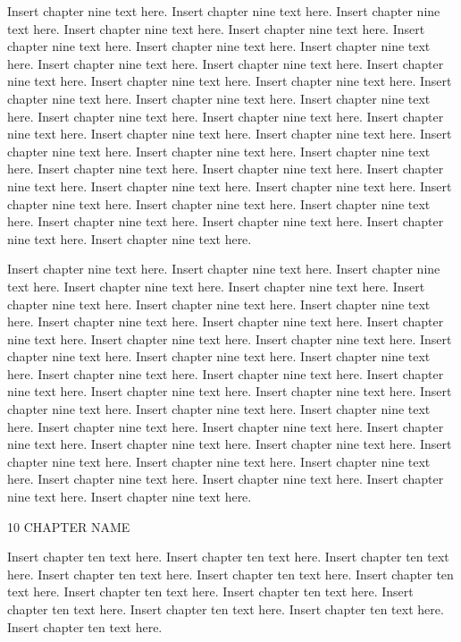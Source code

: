 Insert chapter nine text here. Insert chapter nine text here. Insert chapter nine text here. Insert chapter nine text here. Insert chapter nine text here. Insert chapter nine text here. Insert chapter nine text here. Insert chapter nine text here. Insert chapter nine text here. Insert chapter nine text here. Insert chapter nine text here. Insert chapter nine text here. Insert chapter nine text here. Insert chapter nine text here. Insert chapter nine text here. Insert chapter nine text here. Insert chapter nine text here. Insert chapter nine text here. Insert chapter nine text here. Insert chapter nine text here. Insert chapter nine text here. Insert chapter nine text here. Insert chapter nine text here. Insert chapter nine text here. Insert chapter nine text here. Insert chapter nine text here. Insert chapter nine text here. Insert chapter nine text here. Insert chapter nine text here. Insert chapter nine text here. Insert chapter nine text here. Insert chapter nine text here. Insert chapter nine text here. Insert chapter nine text here. Insert chapter nine text here. Insert chapter nine text here.

Insert chapter nine text here. Insert chapter nine text here. Insert chapter nine text here. Insert chapter nine text here. Insert chapter nine text here. Insert chapter nine text here. Insert chapter nine text here. Insert chapter nine text here. Insert chapter nine text here. Insert chapter nine text here. Insert chapter nine text here. Insert chapter nine text here. Insert chapter nine text here. Insert chapter nine text here. Insert chapter nine text here. Insert chapter nine text here. Insert chapter nine text here. Insert chapter nine text here. Insert chapter nine text here. Insert chapter nine text here. Insert chapter nine text here. Insert chapter nine text here. Insert chapter nine text here. Insert chapter nine text here. Insert chapter nine text here. Insert chapter nine text here. Insert chapter nine text here. Insert chapter nine text here. Insert chapter nine text here. Insert chapter nine text here. Insert chapter nine text here. Insert chapter nine text here. Insert chapter nine text here. Insert chapter nine text here. Insert chapter nine text here. Insert chapter nine text here.

10 CHAPTER NAME

Insert chapter ten text here. Insert chapter ten text here. Insert chapter ten text here. Insert chapter ten text here. Insert chapter ten text here. Insert chapter ten text here. Insert chapter ten text here. Insert chapter ten text here. Insert chapter ten text here. Insert chapter ten text here. Insert chapter ten text here. Insert chapter ten text here.

